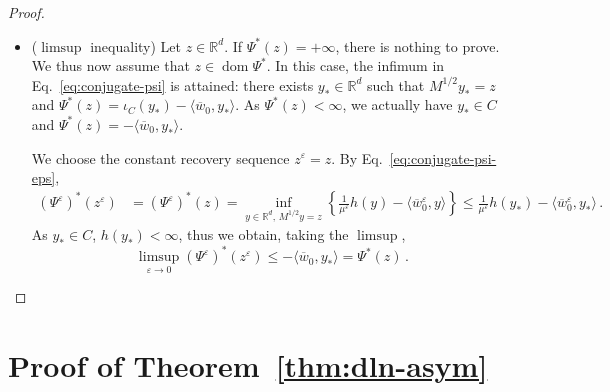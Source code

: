 \documentclass[11pt,english,reqno]{article}
\DeclareMathOperator{\dom}{dom}
\newcommand{\R}{\mathbb{R}}
\renewcommand{\leq}{\leqslant}
\renewcommand{\geq}{\geqslant}
\theoremstyle{plain}
\theoremstyle{definition}
\theoremstyle{remark}
\numberwithin{equation}{section}
\begin{document}
\begin{proof}
\begin{itemize}
\begin{align}
\begin{split}
	&= -\frac{1}{\mu^\varepsilon} h^*(0) + (\overline{\Psi}^\varepsilon)^*(z^\varepsilon) \, ,
		\end{split}
	\end{align}
	where in the last equality we use Eq.~\eqref{eq:conjugate-overline-psi-eps}. We have $h^*(0) < \infty$ by the standing assumption $\dom h^*=\R^d$, and by Proposition~\ref{prop:mosco-fenchel} applied to the Mosco convergence $\overline{\Psi}^\varepsilon \xrightarrow[\varepsilon\to 0]{\mathsf{M}} \Psi$,
	\begin{equation*}
		\liminf_{\varepsilon \to 0} (\overline{\Psi}^\varepsilon)^*(z^\varepsilon) \geq \Psi^*(z) \, . 
	\end{equation*}
	Thus taking the $\liminf$ in Eq.~\eqref{eq:aux-1}, we obtain 
	\begin{equation*}
		\liminf_{\varepsilon\to 0} (\Psi^\varepsilon)^*(z^\varepsilon) \geq \Psi^*(z) \, . 
	\end{equation*}
	\item ($\limsup$ inequality) Let $z \in \R^d$. If $\Psi^*(z) = +\infty$, there is nothing to prove. We thus now assume that $z \in \dom \Psi^*$. In this case, the infimum in Eq.~\eqref{eq:conjugate-psi} is attained: there exists $y_* \in \R^d$ such that $M^{1/2}y_* = z$ and $\Psi^*(z) = \iota_{C}(y_*) - \langle \overline{w}_0, y_* \rangle$. As $\Psi^*(z) < \infty$, we actually have $y_* \in C$ and $\Psi^*(z) = - \langle \overline{w}_0, y_* \rangle$. 
	
	We choose the constant recovery sequence $z^\varepsilon = z$. By Eq.~\eqref{eq:conjugate-psi-eps},
	\begin{align*}
		(\Psi^\varepsilon)^*(z^\varepsilon) &= (\Psi^\varepsilon)^*(z) = \inf_{y \in \R^d, \,  M^{1/2}y=z} \left\{\frac{1}{\mu^\varepsilon}h(y)-\langle \overline{w}_0^\varepsilon, y \rangle\right\} \leq \frac{1}{\mu^\varepsilon}h(y_*) - \langle \overline{w}_0^\varepsilon, y_* \rangle \, .
	\end{align*}
	As $y_* \in C$, $h(y_*) < \infty$, thus we obtain, taking the $\limsup$,
	\begin{equation*}
		\limsup_{\varepsilon \to 0} (\Psi^\varepsilon)^*(z^\varepsilon) \leq - \langle \overline{w}_0, y_* \rangle = \Psi^*(z) \, . 
	\end{equation*}
\end{itemize}
\end{proof} 

\section{Proof of Theorem~\ref{thm:dln-asym}}
\label{sec:proof-dln-asym}
\end{document}
